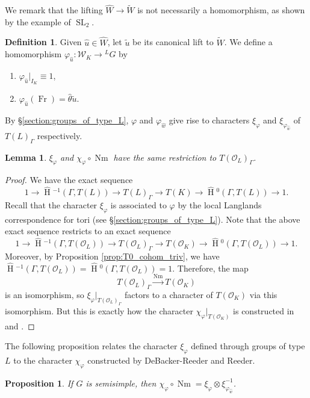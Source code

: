 \documentclass{compositio}
\theoremstyle{plain}
\newtheorem{proposition}[theorem]{Proposition}
\newtheorem{lemma}[theorem]{Lemma}
\newcommand{\HT}[1]{\hat{\HH}{}^{#1}}
\theoremstyle{definition}
\newtheorem{definition}[theorem]{Definition}
\DeclareMathOperator{\HH}{H}
\DeclareMathOperator{\Nm}{Nm}
\DeclareMathOperator{\Fr}{Fr}
\DeclareMathOperator{\SL}{SL}
\newcommand{\OK}{\mathcal{O}_K}
\newcommand{\OL}{\mathcal{O}_L}
\newcommand{\Weil}{\mathcal{W}}
\begin{document}
We remark that the lifting $\hat{W} \rightarrow \widetilde{W}$ is not necessarily a homomorphism,
as shown by the example of $\SL_2$.

\begin{definition} \label{def:phiu}
Given $\hat{u} \in \hat{W}$, let $\tilde{u}$ be its canonical lift to $\widetilde{W}$.
We define a homomorphism $\varphi_{\hat{u}} : \Weil_K \rightarrow {}^L G$ by
\begin{enumerate}
\item $\varphi_{\hat{u}}|_{I_K} \equiv 1$,
\item $\varphi_{\hat{u}}(\Fr) = \hat{\theta} \tilde{u}$.
\end{enumerate}
\end{definition}

By
\S\ref{section:groups_of_type_L}, $\varphi$ and $\varphi_{\hat{w}}$ give rise to characters
$\xi_{\varphi}$ and $\xi_{\varphi_{\hat{w}}}$ of $T(L)_{\Gamma}$ respectively.

\begin{lemma} \label{lem:GDR_compat}
$\xi_{\varphi}$ and $\chi_{\varphi} \circ \Nm$ have the same restriction to $T(\OL)_{\Gamma}$.
\end{lemma}

\begin{proof}
We have the exact sequence
$$1 \rightarrow \HT{-1}(\Gamma, T(L)) \rightarrow T(L)_{\Gamma} \rightarrow T(K)
  \rightarrow \HT{0}(\Gamma, T(L)) \rightarrow 1.$$
Recall that the character $\xi_{\varphi}$ is associated to $\varphi$ by
the local Langlands correspondence for tori (see \S\ref{section:groups_of_type_L}).
Note that the above exact sequence restricts to an exact sequence
$$1 \rightarrow \HT{-1}(\Gamma, T(\OL)) \rightarrow T(\OL)_{\Gamma}
  \rightarrow T(\OK) \rightarrow \HT{0}(\Gamma, T(\OL)) \rightarrow 1.$$
Moreover, by Proposition \ref{prop:T0_cohom_triv}, we have
$\HT{-1}(\Gamma, T(\OL)) = \HT{0}(\Gamma, T(\OL)) = 1$.
Therefore, the map
$$T(\OL)_{\Gamma} \xrightarrow{\Nm} T(\OK)$$
is an isomorphism, so
$\xi_{\varphi}|_{T(\OL)_{\Gamma}}$ factors to a character of
$T(\OK)$ via this isomorphism.  But this is exactly how the character
$\chi_{\varphi}|_{T(\OK)}$ is constructed in \cite{reeder-debacker:09a} and \cite{reeder:08a}.
\end{proof}

The following proposition relates the character $\xi_\varphi$ defined through groups of type $L$ to the character $\chi_\varphi$ constructed by DeBacker-Reeder and Reeder.

\begin{proposition}\label{prop:existenceofrectifier}
If $G$ is semisimple, then $\chi_{\varphi} \circ \Nm = \xi_{\varphi} \otimes \xi_{\varphi_{\hat{w}}}^{-1}$.
\end{proposition}
\end{document}
